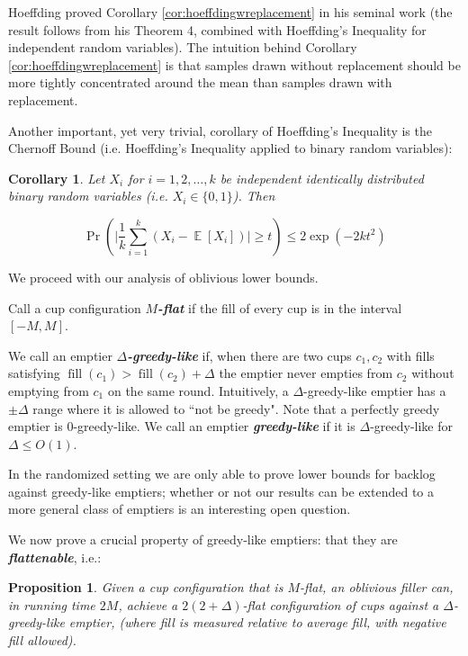 \documentclass[twocolumn]{article}[10pt]
\newcommand{\defn}[1]{{\textit{\textbf{\boldmath #1}}}\xspace}
\DeclareMathOperator{\E}{\mathbb{E}}
\DeclareMathOperator{\fil}{\text{fill}}
\newtheorem{proposition}{Proposition}
\newtheorem{corollary}{Corollary}
\begin{document}
Hoeffding proved Corollary \ref{cor:hoeffdingwreplacement} in his seminal work
\cite{who62} (the result follows from his Theorem 4, combined with Hoeffding's
Inequality for independent random variables).
The intuition behind Corollary \ref{cor:hoeffdingwreplacement} is that samples
drawn without replacement should be more tightly concentrated around the mean
than samples drawn with replacement.

Another important, yet very trivial, corollary of Hoeffding's Inequality is the
Chernoff Bound (i.e. Hoeffding's Inequality applied to binary random
variables):
\begin{corollary}
  \label{cor:chernoffbound}
  Let $X_i$ for $i=1,2,\ldots, k$ be independent identically distributed binary
  random variables (i.e. $X_i\in \{0,1\}$). Then 

  $$\Pr\left(\Big|\frac{1}{k} \sum_{i=1}^k (X_i - \E[X_i])\Big|\ge t\right) \le
  2\exp\left(-2kt^2 \right) $$
\end{corollary}

We proceed with our analysis of oblivious lower bounds.

Call a cup configuration $M$\defn{-flat} if the fill of every cup is in the
interval $[-M, M]$.

We call an emptier $\Delta$\defn{-greedy-like} if, when there are two cups
$c_1, c_2$ with fills satisfying $\fil(c_1) > \fil(c_2) + \Delta$ the emptier
never empties from $c_2$ without emptying from $c_1$ on the same round.
Intuitively, a $\Delta$-greedy-like emptier has a $\pm \Delta$ range where it
is allowed to ``not be greedy". Note that a perfectly greedy emptier is
$0$-greedy-like. We call an emptier \defn{greedy-like} if it is
$\Delta$-greedy-like for $\Delta \le O(1)$.

In the randomized setting we are only able to prove lower bounds for backlog
against greedy-like emptiers; whether or not our results can be extended to a
more general class of emptiers is an interesting open question. 

We now prove a crucial property of greedy-like emptiers: that they are \defn{flattenable}, i.e.:
\begin{proposition}
  \label{prop:greedylikeisflat}
  Given a cup configuration that is $M$-flat, an oblivious filler can, in
  running time $2M$, achieve a $2(2+\Delta)$-flat configuration of cups against
  a $\Delta$-greedy-like emptier, (where fill is measured relative to average
  fill, with negative fill allowed). 
\end{proposition}
\end{document}

